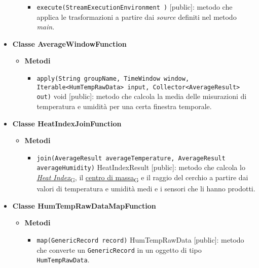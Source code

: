 \begin{itemize}
\begin{itemize}
\begin{itemize}
			            \item \texttt{execute(StreamExecutionEnvironment )} [public]: metodo che applica le trasformazioni a partire dai \textit{source} definiti nel metodo \textit{main}.
		            \end{itemize}
	      \end{itemize}
	\item \textbf{Classe AverageWindowFunction}
	      \begin{itemize}
		      \item \textbf{Metodi}
		            \begin{itemize}
			            \item \texttt{apply(String groupName, TimeWindow window, Iterable<HumTempRawData> input, Collector<AverageResult> out)} void [public]: metodo che calcola la media delle misurazioni di temperatura e umidità per una certa finestra temporale.
		            \end{itemize}
	      \end{itemize}
	\item \textbf{Classe HeatIndexJoinFunction}
	      \begin{itemize}
		      \item \textbf{Metodi}
		            \begin{itemize}
			            \item \texttt{join(AverageResult averageTemperature, AverageResult averageHumidity)} HeatIndexResult [public]: metodo che calcola lo \href{https://7last.github.io/docs/pb/documentazione-interna/glossario\#heat-index}{\textit{Heat Index}\textsubscript{G}}, il \href{https://7last.github.io/docs/pb/documentazione-interna/glossario\#centro-di-massa}{centro di massa\textsubscript{G}} e il raggio del cerchio a partire dai valori di temperatura e umidità medi e i sensori che li hanno prodotti.
		            \end{itemize}
	      \end{itemize}
	\item \textbf{Classe HumTempRawDataMapFunction}
	      \begin{itemize}
		      \item \textbf{Metodi}
		            \begin{itemize}
			            \item \texttt{map(GenericRecord record)} HumTempRawData [public]: metodo che converte un \texttt{GenericRecord} in un oggetto di tipo \texttt{HumTempRawData}.
		            \end{itemize}

\end{itemize}
\end{itemize}

